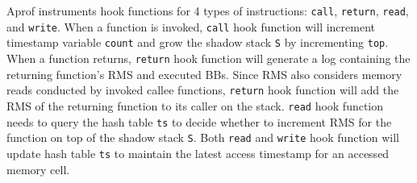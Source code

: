 Aprof instruments hook functions for 4 types of instructions: 
\texttt{call}, \texttt{return}, \texttt{read}, and \texttt{write}. 
When a function is invoked, 
\texttt{call} hook function will increment timestamp variable \texttt{count}
and grow the shadow stack \texttt{S} by incrementing \texttt{top}.
When a function returns,
\texttt{return} hook function will 
generate a log 
containing the returning function's RMS and executed BBs.
Since RMS also considers memory reads conducted by 
invoked callee functions, 
\texttt{return} hook function will add 
the RMS of the returning function to its caller on the stack. 
\texttt{read} hook function needs to query the hash table \texttt{ts} to decide  
whether to increment RMS for the function on top of the shadow stack \texttt{S}.
Both \texttt{read} and \texttt{write} 
hook function will update hash table \texttt{ts}
to maintain the latest access timestamp for an accessed memory cell. 




